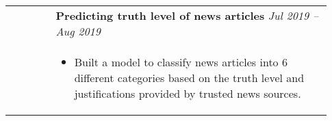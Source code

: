 \documentclass[letterpaper, 10pt, oneside]{article}
\newcommand{\bdit}[1]{{\textbf{#1}}}
\begin{document}
\begin{longtable}{@{} p{0.13\linewidth} p{0.8\linewidth}}
                         & \bdit{Predicting truth level of news articles} \hfill \textsl{Jul 2019 -- Aug 2019}                                                                                       \\
                         & \parbox{0.8\textwidth}{                                                                                                                                                   %
        \begin{itemize}[leftmargin=*, itemsep=-0.88ex, topsep=0.2ex]
            \item Built a model to classify news articles into 6 different categories based on the truth level and justifications provided by trusted news sources.
        \end{itemize}
    }                                                                                                                                                                                                \\
    \\[-1ex]




\end{longtable}
\end{document}
